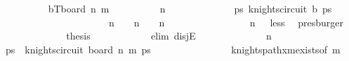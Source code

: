 \begin{isabellebody}
\ \ \ \ \ \ \ \ \isamarkupfalse%
\ {\isacharquery}{\kern0pt}bT{\isacharequal}{\kern0pt}{\isachardoublequoteopen}board\ {\isacharparenleft}{\kern0pt}n{\isacharminus}{\kern0pt}{}{\isacharparenright}{\kern0pt}\ m{\isachardoublequoteclose}\isanewline
\ \ \ \ \ \ \ \ \isamarkupfalse%
\ {\isachardoublequoteopen}n{\isacharminus}{\kern0pt}{}\ {\isasymge}\ {}{\isachardoublequoteclose}\isanewline
\ \ \ \ \ \ \ \ \isamarkupfalse%
\ \isamarkupfalse%
\ {\isachardoublequoteopen}{\isasymexists}ps{\isachardot}{\kern0pt}\ knights{\isacharunderscore}{\kern0pt}circuit\ {\isacharquery}{\kern0pt}b\ ps{\isachardoublequoteclose}\isanewline
\ \ \ \ \ \ \ \ \isamarkupfalse%
\ {\isacharminus}{\kern0pt}\isanewline
\ \ \ \ \ \ \ \ \ \ \isamarkupfalse%
\ {\isachardoublequoteopen}n{\isacharminus}{\kern0pt}{}\ {\isacharequal}{\kern0pt}\ {}\ {\isasymor}\ n{\isacharminus}{\kern0pt}{}\ {\isacharequal}{\kern0pt}\ {}\ {\isasymor}\ n{\isacharminus}{\kern0pt}{}\ {\isasymge}\ {}{}{\isachardoublequoteclose}\ \isanewline
\ \ \ \ \ \ \ \ \ \ \ \ \isamarkupfalse%
\ {\isacartoucheopen}n{\isacharminus}{\kern0pt}{}\ {\isasymge}\ {}{\isacartoucheclose}\ less\ \isamarkupfalse%
\ presburger\isanewline
\ \ \ \ \ \ \ \ \ \ \isamarkupfalse%
\ \isamarkupfalse%
\ {\isacharquery}{\kern0pt}thesis\isanewline
\ \ \ \ \ \ \ \ \ \ \isamarkupfalse%
\ {\isacharparenleft}{\kern0pt}elim\ disjE{\isacharparenright}{\kern0pt}\isanewline
\ \ \ \ \ \ \ \ \ \ \ \ \isamarkupfalse%
\ {\isachardoublequoteopen}n{\isacharminus}{\kern0pt}{}\ {\isacharequal}{\kern0pt}\ {}{\isachardoublequoteclose}\isanewline
\ \ \ \ \ \ \ \ \ \ \ \ \isamarkupfalse%
\ \isamarkupfalse%
\ ps\ \ {\isachardoublequoteopen}knights{\isacharunderscore}{\kern0pt}circuit\ {\isacharparenleft}{\kern0pt}board\ {\isacharparenleft}{\kern0pt}n{\isacharminus}{\kern0pt}{}{\isacharparenright}{\kern0pt}\ m{\isacharparenright}{\kern0pt}\ ps{\isachardoublequoteclose}\isanewline
\ \ \ \ \ \ \ \ \ \ \ \ \ \ \isamarkupfalse%
\ knights{\isacharunderscore}{\kern0pt}path{\isacharunderscore}{\kern0pt}{}xm{\isacharunderscore}{\kern0pt}exists{\isacharbrackleft}{\kern0pt}of\ m{\isacharbrackright}{\kern0pt}\ \isamarkupfalse%

\end{isabellebody}
